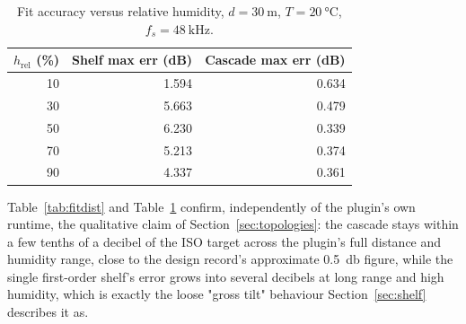 \documentclass[11pt,a4paper]{article}
\begin{document}
\begin{table}[h]
\centering
\caption{Fit accuracy versus relative humidity, $d=\SI{30}{\meter}$, $T=\SI{20}{\celsius}$, $f_s=\SI{48}{\kilo\hertz}$.}
\label{tab:fitrh}
\begin{tabular}{@{}rrr@{}}
\toprule
$h_\text{rel}$ (\%) & Shelf max err (dB) & Cascade max err (dB) \\
\midrule
10 & 1.594 & 0.634 \\
30 & 5.663 & 0.479 \\
50 & 6.230 & 0.339 \\
70 & 5.213 & 0.374 \\
90 & 4.337 & 0.361 \\
\bottomrule
\end{tabular}
\end{table}

Table~\ref{tab:fitdist} and Table~\ref{tab:fitrh} confirm, independently of the plugin's own runtime, the qualitative claim of Section~\ref{sec:topologies}: the cascade stays within a few tenths of a decibel of the ISO target across the plugin's full distance and humidity range, close to the design record's approximate \SI{0.5}{\decibel} figure, while the single first-order shelf's error grows into several decibels at long range and high humidity, which is exactly the loose "gross tilt" behaviour Section~\ref{sec:shelf} describes it as.



\end{document}
